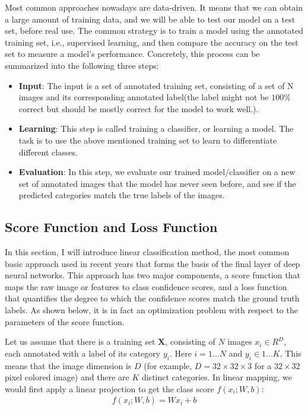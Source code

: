 Most common approaches nowadays are data-driven. It means that we can obtain a large amount of training data, and we will be able to test our model on a test set, before real use. The common strategy is to train a model using the annotated training set, i.e., supervised learning, and then compare the accuracy on the test set to measure a model's performance. Concretely, this process can be summarized into the following three steps:
\begin{itemize}
	\item \textbf{Input}: The input is a set of annotated training set, consisting of a set of N images and its corresponding annotated label(the label might not be $100\%$ correct but should be mostly correct for the model to work well.).
	\item \textbf{Learning}: This step is called training a classifier, or learning a model. The task is to use the above mentioned training set to learn to differentiate different classes.
	\item \textbf{Evaluation}: In this step, we evaluate our trained model/classifier on a new set of annotated images that the model has never seen before, and see if the predicted categories match the true labels of the images. 
\end{itemize}

\subsection{Score Function and Loss Function}
In this section, I will introduce linear classification method, the most common basic approach used in recent years that forms the basis of the final layer of deep neural networks. This approach has two major components, a score function that maps the raw image or features to class confidence scores, and a loss function that quantifies the degree to which the confidence scores match the ground truth labels. As shown below, it is in fact an optimization problem with respect to the parameters of the score function.

Let us assume that there is a training set $\mathbf{X}$, consisting of $N$ images $x_i \in R^D$, each annotated with a label of its category $y_i$. Here $i = 1 ...N$ and $y_i \in 1 ... K$. This means that the image dimension is $D$ (for example, $D=32\times32\times3$ for a $32\times32$ pixel colored image) and there are $K$ distinct categories. In linear mapping, we would first apply a linear projection to get the class score $f(x_i; W, b)$:
\begin{align}
f(x_i; W, b) = Wx_i + b
\end{align}

